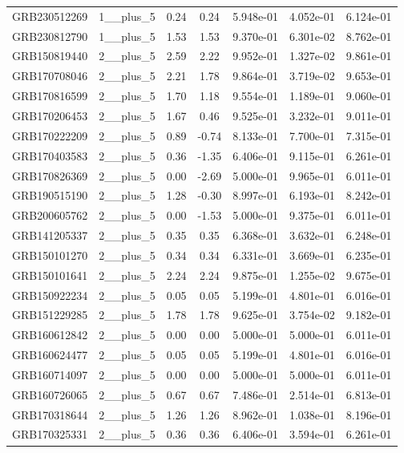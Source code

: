 \documentclass[12pt]{article}
\begin{document}
\begin{table}[h!]
{\begin{tabular}{l c c c c c c}
GRB230512269 & 1__plus_5 & 0.24 & 0.24 & 5.948e-01 & 4.052e-01 & 6.124e-01 \\
GRB230812790 & 1__plus_5 & 1.53 & 1.53 & 9.370e-01 & 6.301e-02 & 8.762e-01 \\
GRB150819440 & 2__plus_5 & 2.59 & 2.22 & 9.952e-01 & 1.327e-02 & 9.861e-01 \\
GRB170708046 & 2__plus_5 & 2.21 & 1.78 & 9.864e-01 & 3.719e-02 & 9.653e-01 \\
GRB170816599 & 2__plus_5 & 1.70 & 1.18 & 9.554e-01 & 1.189e-01 & 9.060e-01 \\
GRB170206453 & 2__plus_5 & 1.67 & 0.46 & 9.525e-01 & 3.232e-01 & 9.011e-01 \\
GRB170222209 & 2__plus_5 & 0.89 & -0.74 & 8.133e-01 & 7.700e-01 & 7.315e-01 \\
GRB170403583 & 2__plus_5 & 0.36 & -1.35 & 6.406e-01 & 9.115e-01 & 6.261e-01 \\
GRB170826369 & 2__plus_5 & 0.00 & -2.69 & 5.000e-01 & 9.965e-01 & 6.011e-01 \\
GRB190515190 & 2__plus_5 & 1.28 & -0.30 & 8.997e-01 & 6.193e-01 & 8.242e-01 \\
GRB200605762 & 2__plus_5 & 0.00 & -1.53 & 5.000e-01 & 9.375e-01 & 6.011e-01 \\
GRB141205337 & 2__plus_5 & 0.35 & 0.35 & 6.368e-01 & 3.632e-01 & 6.248e-01 \\
GRB150101270 & 2__plus_5 & 0.34 & 0.34 & 6.331e-01 & 3.669e-01 & 6.235e-01 \\
GRB150101641 & 2__plus_5 & 2.24 & 2.24 & 9.875e-01 & 1.255e-02 & 9.675e-01 \\
GRB150922234 & 2__plus_5 & 0.05 & 0.05 & 5.199e-01 & 4.801e-01 & 6.016e-01 \\
GRB151229285 & 2__plus_5 & 1.78 & 1.78 & 9.625e-01 & 3.754e-02 & 9.182e-01 \\
GRB160612842 & 2__plus_5 & 0.00 & 0.00 & 5.000e-01 & 5.000e-01 & 6.011e-01 \\
GRB160624477 & 2__plus_5 & 0.05 & 0.05 & 5.199e-01 & 4.801e-01 & 6.016e-01 \\
GRB160714097 & 2__plus_5 & 0.00 & 0.00 & 5.000e-01 & 5.000e-01 & 6.011e-01 \\
GRB160726065 & 2__plus_5 & 0.67 & 0.67 & 7.486e-01 & 2.514e-01 & 6.813e-01 \\
GRB170318644 & 2__plus_5 & 1.26 & 1.26 & 8.962e-01 & 1.038e-01 & 8.196e-01 \\
GRB170325331 & 2__plus_5 & 0.36 & 0.36 & 6.406e-01 & 3.594e-01 & 6.261e-01 \\

\end{tabular}}
\end{table}
\end{document}
